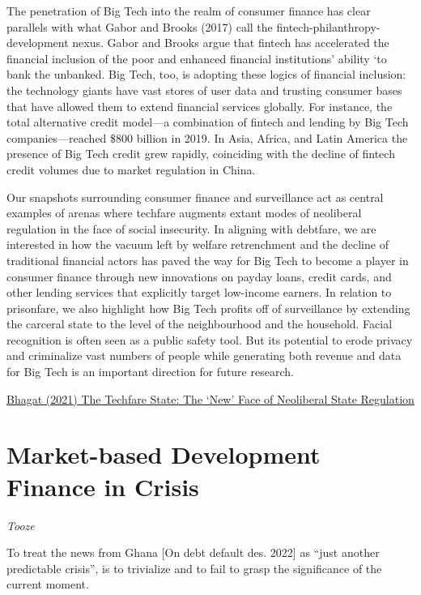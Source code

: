 \documentclass[
]{book}
\begin{document}
The penetration of Big Tech into the realm of consumer finance has clear parallels with what Gabor and Brooks (2017) call the fintech-philanthropy-development nexus. Gabor and Brooks argue that fintech has accelerated the financial inclusion of the poor and enhanced financial institutions' ability `to bank the unbanked. Big Tech, too, is adopting these logics of financial inclusion: the technology giants have vast stores of user data and trusting consumer bases that have allowed them to extend financial services globally. For instance, the total alternative credit model---a combination of fintech and lending by Big Tech companies---reached \$800 billion in 2019. In Asia, Africa, and Latin America the presence of Big Tech credit grew rapidly, coinciding with the decline of fintech credit volumes due to market regulation in China.

Our snapshots surrounding consumer finance and surveillance act as central examples of arenas where techfare augments extant modes of neoliberal regulation in the face of social insecurity. In aligning with debtfare, we are interested in how the vacuum left by welfare retrenchment and the decline of traditional financial actors has paved the way for Big Tech to become a player in consumer finance through new innovations on payday loans, credit cards, and other lending services that explicitly target low-income earners. In relation to prisonfare, we also highlight how Big Tech profits off of surveillance by extending the carceral state to the level of the neighbourhood and the household. Facial recognition is often seen as a public safety tool. But its potential to erode privacy and criminalize vast numbers of people while generating both revenue and data for Big Tech is an important direction for future research.

\href{https://developingeconomics.org/2021/06/15/the-techfare-state-the-new-face-of-neoliberal-state-regulation/}{Bhagat (2021) The Techfare State: The `New' Face of Neoliberal State Regulation}

\hypertarget{market-based-development-finance-in-crisis}{%
\section{Market-based Development Finance in Crisis}\label{market-based-development-finance-in-crisis}}

\emph{Tooze}

To treat the news from Ghana {[}On debt default des. 2022{]} as ``just another predictable crisis'', is to trivialize and to fail to grasp the significance of the current moment.
\end{document}
